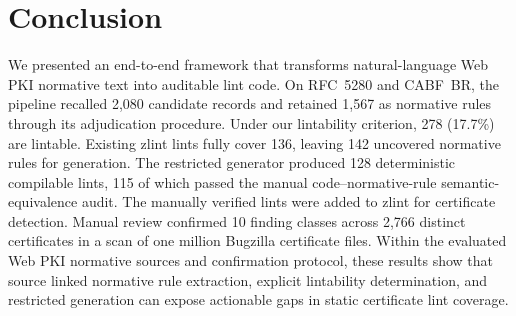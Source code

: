 \section{Conclusion}
\label{sec:conclusion}

We presented an end-to-end framework that transforms natural-language Web PKI
normative text into auditable lint code. On RFC~5280 and CABF~BR, the
pipeline recalled 2,080 candidate records and retained 1,567 as normative rules through
its adjudication procedure.
Under our lintability criterion, 278 (17.7\%) are lintable.
Existing zlint lints fully cover 136, leaving 142 uncovered normative rules for generation.
The restricted generator produced 128 deterministic compilable lints, 115 of which passed the manual code--normative-rule
semantic-equivalence audit.
The manually verified lints were added to zlint for certificate detection.
Manual review confirmed 10 finding classes across 2,766 distinct certificates
in a scan of one million Bugzilla certificate files.
Within the evaluated Web PKI
normative sources and confirmation protocol, these results show that source linked
normative rule extraction, explicit lintability determination, and restricted
generation can expose actionable gaps in static certificate lint coverage.
